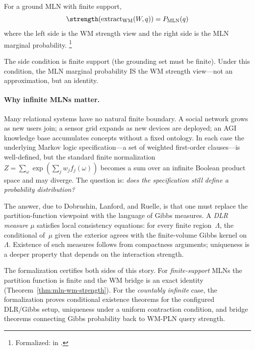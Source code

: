 \documentclass[11pt,openany]{report}
\begin{document}
\begin{theorem}
\label{thm:mln-wm-strength}
For a ground MLN with finite support,
\[
  \strength(\mathrm{extract}_{\mathrm{WM}}(W, q))
  = P_{\mathrm{MLN}}(q)
\]
where the left side is the WM strength view and the right side is
the MLN marginal probability.%
\footnote{Formalized:
in .}
\end{theorem}

\noindent
The side condition is finite support (the grounding set must be
finite).  Under this condition, the MLN marginal probability IS
the WM strength view---not an approximation, but an identity.

\paragraph{Why infinite MLNs matter.}
Many relational systems have no natural finite boundary.  A social network
grows as new users join; a sensor grid expands as new devices are deployed;
an AGI knowledge base accumulates concepts without a fixed ontology.  In each
case the underlying Markov logic specification---a set of weighted first-order
clauses---is well-defined, but the standard finite normalization
$Z = \sum_{\omega}\exp(\sum_j w_j f_j(\omega))$ becomes a sum over an infinite
Boolean product space and may diverge.  The question is: \emph{does the
specification still define a probability distribution?}

The answer, due to Dobrushin, Lanford, and Ruelle, is that one must replace
the partition-function viewpoint with the language of Gibbs measures.  A
\emph{DLR measure} $\mu$ satisfies local consistency equations: for every
finite region~$\Lambda$, the conditional of~$\mu$ given the exterior agrees
with the finite-volume Gibbs kernel on~$\Lambda$.  Existence of such measures
follows from compactness arguments; uniqueness is a deeper property that
depends on the interaction strength.

The formalization certifies both sides of this story.  For
\emph{finite-support} MLNs the partition function is finite and the WM bridge
is an exact identity (Theorem~\ref{thm:mln-wm-strength}).  For the
\emph{countably infinite} case, the formalization proves conditional
existence theorems for the configured DLR/Gibbs setup, uniqueness under a
uniform contraction condition, and bridge theorems connecting Gibbs
probability back to WM-PLN query strength.
\end{document}
